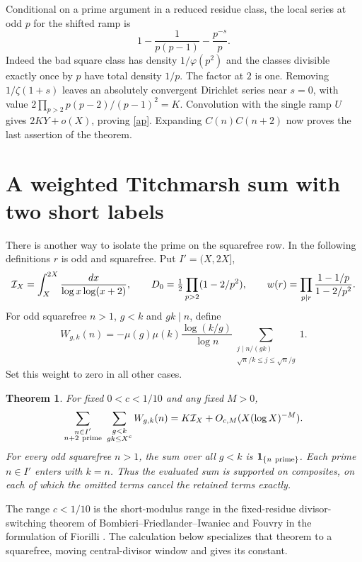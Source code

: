 \documentclass[11pt]{article}
\newtheorem{theorem}{Theorem}
\begin{document}
Conditional on a prime argument in a reduced residue class, the
local series at odd $p$ for the shifted ramp is
\[
 1-\frac1{p(p-1)}-\frac{p^{-s}}p.
\]
Indeed the bad square class has density $1/\varphi(p^2)$ and the
classes divisible exactly once by $p$ have total density $1/p$.
The factor at $2$ is one. Removing $1/\zeta(1+s)$ leaves an
absolutely convergent Dirichlet series near $s=0$, with value
$2\prod_{p>2}p(p-2)/(p-1)^2=K$. Convolution with the single
ramp $U$ gives $2KY+o(X)$, proving \eqref{ap}.
Expanding $C(n)C(n+2)$ now proves the last assertion of the theorem.


\section{A weighted Titchmarsh sum with two short labels}\label{sec:corner}
There is another way to isolate the prime on the squarefree row. In the following definitions $r$ is odd and squarefree.
Put \(I'=(X,2X]\),
\[
 {\cal I}_X=\int_X^{2X}\frac{dx}{\log x\log(x+2)},\qquad
 D_0=\tfrac12\prod_{p>2}(1-2/p^2),\qquad
 w(r)=\prod_{p\mid r}\frac{1-1/p}{1-2/p^2}
.
\]
For odd squarefree \(n>1\), \(g<k\) and \(gk\mid n\), define
\[
 W_{g,k}(n)=-\mu(g)\mu(k)\frac{\log(k/g)}{\log n}
 \sum_{\substack{j\mid n/(gk)\\\sqrt n/k\le j\le\sqrt n/g}}1 .
\]
Set this weight to zero in all other cases.
\begin{theorem}\label{th:corner}
For fixed \(0<c<1/10\) and any fixed \(M>0\),
\[
 \sum_{\substack{n\in I'\\n+2\ {\rm prime}}}\ 
       \sum_{\substack{g<k\\gk\le X^c}} W_{g,k}(n)
      =K{\cal I}_X+O_{c,M}(X(\log X)^{-M}).
\]
For every odd squarefree \(n>1\), the sum over all \(g<k\) is
\(\mathbf1_{\{n\ {\rm prime}\}}\). Each prime \(n\in I'\) enters with \(k=n\).
Thus the evaluated sum is supported on composites, on each of which the omitted
terms cancel the retained terms exactly.
\end{theorem}
The range \(c<1/10\) is the short-modulus range in the fixed-residue
divisor-switching theorem of Bombieri--Friedlander--Iwaniec and Fouvry
in the formulation of Fiorilli \cite[Theorems 1.4 and 3.4]{Fiorilli}.
The calculation below specializes that theorem to a squarefree, moving
central-divisor window and gives its constant.
\end{document}
